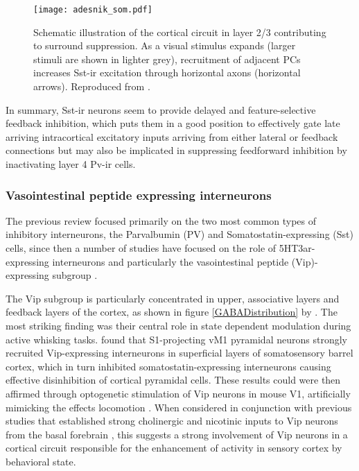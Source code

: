 \begin{figure}
	\centering
        \texttt{[image: adesnik\_som.pdf]}
	\caption[Schematic proposing Sst neurons role in integrating
      long-range inputs. Reproduced from
      \cite{Adesnik2012}.]{Schematic illustration of the cortical
      circuit in layer 2/3 contributing to surround suppression. As a
      visual stimulus expands (larger stimuli are shown in lighter
      grey), recruitment of adjacent PCs increases Sst-ir excitation
      through horizontal axons (horizontal arrows). Reproduced from
      \cite{Adesnik2012}.}
	\label{som}
\end{figure}

In summary, Sst-ir neurons seem to provide delayed and
feature-selective feedback inhibition, which puts them in a good
position to effectively gate late arriving intracortical excitatory
inputs arriving from either lateral or feedback connections but may
also be implicated in suppressing feedforward inhibition by
inactivating layer 4 Pv-ir cells.

\subsubsection{Vasointestinal peptide expressing interneurons}

The previous review focused primarily on the two most common types of
inhibitory interneurons, the Parvalbumin (PV) and
Somatostatin-expressing (Sst) cells, since then a number of studies
have focused on the role of 5HT3ar-expressing interneurons and
particularly the vasointestinal peptide (Vip)-expressing subgroup
\citep{Fu2014, Higley2014, Kepecs2014, Lee2013}.

The Vip subgroup is particularly concentrated in upper, associative
layers and feedback layers of the cortex, as shown in figure
\ref{GABADistribution} by \cite{Rudy2011}. The most striking finding
was their central role in state dependent modulation during active
whisking tasks. \cite{Lee2013} found that S1-projecting vM1 pyramidal
neurons strongly recruited Vip-expressing interneurons in superficial
layers of somatosensory barrel cortex, which in turn inhibited
somatostatin-expressing interneurons causing effective disinhibition
of cortical pyramidal cells. These results could were then affirmed
through optogenetic stimulation of Vip neurons in mouse V1,
artificially mimicking the effects locomotion \citep{Fu2014}. When
considered in conjunction with previous studies that established
strong cholinergic and nicotinic inputs to Vip neurons from the basal
forebrain \citep{Wickersham2009}, this suggests a strong involvement
of Vip neurons in a cortical circuit responsible for the enhancement
of activity in sensory cortex by behavioral state.

